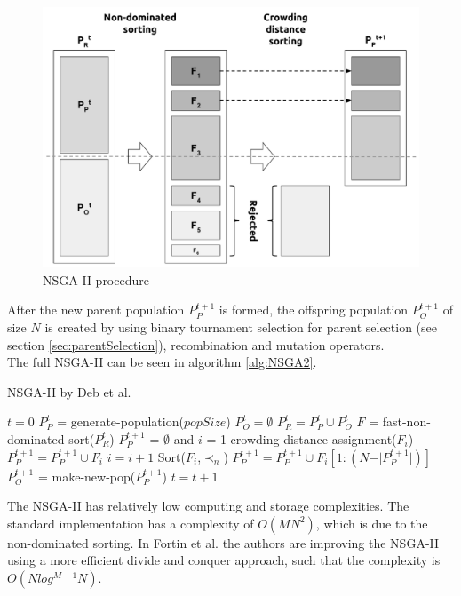     \begin{figure}
        \centering
        \includegraphics[scale=0.3]{./Figures/NSGA2Procedure}
        \caption{NSGA-II procedure\cite{Deb:2002}}
        \label{fig:nsga2procedure}
    \end{figure}
    After the new parent population $P_{P}^{t+1}$ is formed, the offspring population $P_{O}^{t+1}$ of size $N$ is created by using binary tournament selection for parent selection (see section \ref{sec:parentSelection}), recombination and mutation operators.\\
    The full NSGA-II can be seen in algorithm \ref{alg:NSGA2}.
    \begin{algorithm}
        \caption{NSGA-II by Deb et al.\cite{Deb:2002}}
        \label{alg:NSGA2}
        \begin{algorithmic}[1]
                \State $t = 0$
                \State $P_{P}^{t}$ = generate-population($popSize$)
                \State $P_{O}^{t} = \emptyset$
                    \State $P_{R}^{t} = P_{P}^{t} \cup P_{O}^{t}$
                    \State $F$ = fast-non-dominated-sort($P_{R}^{t}$)
                    \State $P_{P}^{t+1}$ = $\emptyset$ and $i$ = 1
                        \State crowding-distance-assignment($F_i$)
                        \State $P_{P}^{t+1} = P_{P}^{t+1} \cup F_i$
                        \State $i = i + 1$
                    \EndWhile
                    \State Sort($F_i$,$\prec_n$)
                    \State $P_{P}^{t+1} = P_{P}^{t+1} \cup F_i[1:(N-\vert P_{P}^{t+1} \vert)]$
                    \State $P_{O}^{t+1}$ = make-new-pop($P_{P}^{t+1}$)
                    \State $t = t + 1$
                \EndWhile
            \EndProcedure
        \end{algorithmic}
    \end{algorithm}
    The NSGA-II has relatively low computing and storage complexities. The standard implementation has a complexity of $O(MN^2)$, which is due to the non-dominated sorting\cite{Deb:2002}. In Fortin et al.\cite{Fortin:2013:GIR:2463372.2463454} the authors are improving the NSGA-II using a more efficient divide and conquer approach, such that the complexity is $O(N log^{M{-}1}N)$.
    
